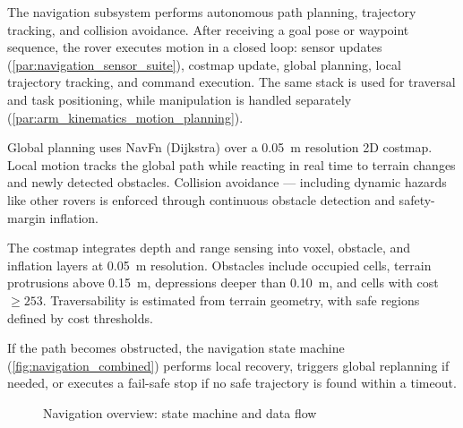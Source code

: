 
The navigation subsystem performs autonomous path planning, trajectory tracking, and collision avoidance. After receiving a goal pose or waypoint sequence, the rover executes motion in a closed loop: sensor updates (\autoref{par:navigation_sensor_suite}), costmap update, global planning, local trajectory tracking, and command execution. The same stack is used for traversal and task positioning, while manipulation is handled separately (\autoref{par:arm_kinematics_motion_planning}).

Global planning uses NavFn (Dijkstra) over a \qty{0.05}{\metre} resolution 2D costmap. Local motion tracks the global path while reacting in real time to terrain changes and newly detected obstacles. Collision avoidance --- including dynamic hazards like other rovers is enforced through continuous obstacle detection and safety-margin inflation.

The costmap integrates depth and range sensing into voxel, obstacle, and inflation layers at \qty{0.05}{\metre} resolution. Obstacles include occupied cells, terrain protrusions above \qty{0.15}{\metre}, depressions deeper than \qty{0.10}{\metre}, and cells with cost $\geq 253$. Traversability is estimated from terrain geometry, with safe regions defined by cost thresholds.

If the path becomes obstructed, the navigation state machine (\autoref{fig:navigation_combined}) performs local recovery, triggers global replanning if needed, or executes a fail-safe stop if no safe trajectory is found within a timeout.
\begin{figure}[H]
  \centering

  \begin{minipage}{0.49\linewidth}
    \centering
    \resizebox{\linewidth}{!}{}
  \end{minipage}
  \hfill
  \begin{minipage}{0.49\linewidth}
    \centering
    \resizebox{\linewidth}{!}{}
  \end{minipage}

  \caption{Navigation overview: state machine and data flow}\label{fig:navigation_combined}
\end{figure}